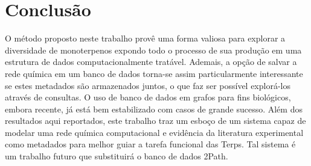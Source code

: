 \chapter{Conclusão}
\label{Conclusao}

O método proposto neste trabalho provê uma forma valiosa para explorar a diversidade de monoterpenos expondo todo o processo de sua produção em uma estrutura de dados computacionalmente tratável. Ademais, a opção de salvar a rede química em um banco de dados torna-se assim particularmente interessante se estes metadados são armazenados juntos, o que faz ser possível explorá-los através de consultas. O uso de banco de dados em grafos para fins biológicos, embora recente, já está bem estabilizado com casos de grande sucesso. Além dos resultados aqui reportados, este trabalho traz um esboço de um sistema capaz de modelar uma rede química computacional e evidência da literatura experimental como metadados para melhor guiar a tarefa funcional das Terps. Tal sistema é um trabalho futuro que substituirá o banco de dados 2Path.
